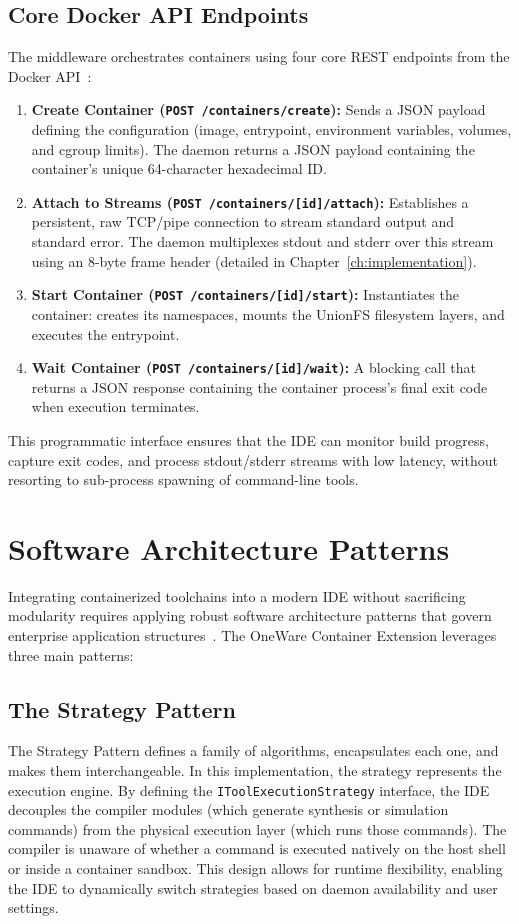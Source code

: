 \subsection{Core Docker API Endpoints}
The middleware orchestrates containers using four core REST endpoints from the Docker API~\cite{dockerapi}:
\begin{enumerate}
    \item \textbf{Create Container (\texttt{POST /containers/create}):} Sends a JSON payload defining the configuration (image, entrypoint, environment variables, volumes, and cgroup limits). The daemon returns a JSON payload containing the container's unique 64-character hexadecimal ID.
    \item \textbf{Attach to Streams (\texttt{POST /containers/[id]/attach}):} Establishes a persistent, raw TCP/pipe connection to stream standard output and standard error. The daemon multiplexes stdout and stderr over this stream using an 8-byte frame header (detailed in Chapter~\ref{ch:implementation}).
    \item \textbf{Start Container (\texttt{POST /containers/[id]/start}):} Instantiates the container: creates its namespaces, mounts the UnionFS filesystem layers, and executes the entrypoint.
    \item \textbf{Wait Container (\texttt{POST /containers/[id]/wait}):} A blocking call that returns a JSON response containing the container process's final exit code when execution terminates.
\end{enumerate}

This programmatic interface ensures that the IDE can monitor build progress, capture exit codes, and process stdout/stderr streams with low latency, without resorting to sub-process spawning of command-line tools.

\section{Software Architecture Patterns}
Integrating containerized toolchains into a modern IDE without sacrificing modularity requires applying robust software architecture patterns that govern enterprise application structures~\cite{fowler2002}. The OneWare Container Extension leverages three main patterns:

\subsection{The Strategy Pattern}
The Strategy Pattern defines a family of algorithms, encapsulates each one, and makes them interchangeable. In this implementation, the strategy represents the execution engine. By defining the \texttt{IToolExecutionStrategy} interface, the IDE decouples the compiler modules (which generate synthesis or simulation commands) from the physical execution layer (which runs those commands). The compiler is unaware of whether a command is executed natively on the host shell or inside a container sandbox. This design allows for runtime flexibility, enabling the IDE to dynamically switch strategies based on daemon availability and user settings.

